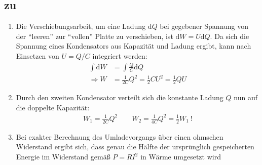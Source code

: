 \documentclass[a4paper]{scrartcl}
\begin{document}
\subsection{zu }
\label{lsg:EnergieKondensator}
\begin{enumerate}[noitemsep]
  \item Die Verschiebungsarbeit, um eine Ladung $\text{d}Q$ bei gegebener Spannung von der "`leeren"' zur "`vollen"' Platte zu verschieben, ist $\text{d}W = U\text{d}Q$. Da sich die Spannung eines Kondensators aus Kapazität und Ladung ergibt, kann nach Einsetzen von $U = Q/C$ integriert werden:
    \begin{align*}
      \int \text{d}W & = \int \frac{Q}{C}\text{d}Q\\
      \Rightarrow W &= \frac{1}{2C}Q^2 = \frac{1}{2}CU^2 = \frac{1}{2}QU
    \end{align*}
  \item Durch den zweiten Kondensator verteilt sich die konstante Ladung $Q$ nun auf die doppelte Kapazität:
    \begin{align*}
      W_1 = \frac{1}{2C}Q^2 \qquad W_2 = \frac{1}{4C}Q^2 = \frac{1}{2}W_1~!
    \end{align*}
  \item Bei exakter Berechnung des Umladevorgangs über einen ohmschen Widerstand ergibt sich, dass genau die Hälfte der ursprünglich gespeicherten Energie im Widerstand gemäß $P = RI^2$ in Wärme umgesetzt wird\\
\end{enumerate}
\end{document}
